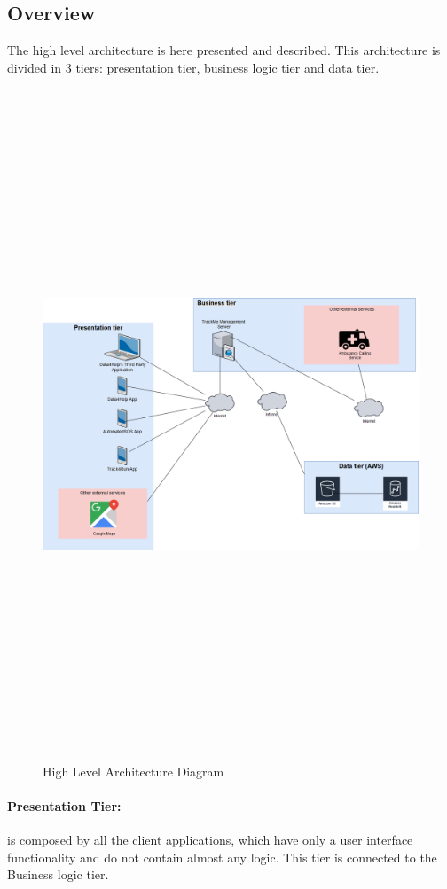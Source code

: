 {\color{secblue}\subsection{Overview}}
The high level architecture is here presented and described. This architecture is divided in 3 tiers: presentation tier, business logic tier and data tier.

\begin{figure}[H]
    \includegraphics[width=.6\linewidth, height = 20cm, keepaspectratio]{./Images/high_level_architecture_diagram.png}
    \centering
    \caption{High Level Architecture Diagram}
  \end{figure}

\paragraph{Presentation Tier:} is composed by all the client applications, which have only a user interface functionality and do not contain almost any logic. This tier is connected to the Business logic tier.

